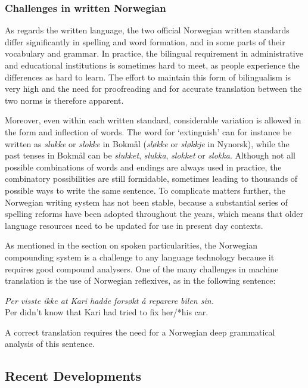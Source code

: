 \begin{multicols}{2}
\subsubsection{Challenges in written Norwegian}

As regards the written language, the two official Norwegian written standards differ significantly in spelling and word formation, and in some parts of their vocabulary and grammar. 
In practice, the bilingual requirement in administrative and educational institutions is sometimes hard to meet, as people experience the differences as hard to learn. 
The effort to maintain this form of bilingualism is very high and the need for proofreading and for accurate translation between the two norms is therefore apparent.


Moreover, even within each written standard, considerable variation is allowed in the form and inflection of words. 
The word for `extinguish' can for instance be written as \textit{slukke} or \textit{slokke} in Bokmål (\textit{sløkke} or \textit{sløkkje} in Nynorsk), while the past tenses in Bokmål can be \textit{slukket}, \textit{slukka}, \textit{slokket} or \textit{slokka}. 
Although not all possible combinations of words and endings are always used in practice, the combinatory possibilities are still formidable, sometimes leading to thousands of possible ways to write the same sentence. 
To complicate matters further, the Norwegian writing system has not been stable, because a substantial series of spelling reforms have been adopted throughout the years, which means that older language resources need to be updated for use in present day contexts.

As mentioned in the section on spoken particularities, the Norwegian compounding system is a challenge to any language technology because it requires good compound analysers.
One of the many challenges in machine translation is the use of Norwegian reflexives, as in the following sentence:

\medskip
\emph{Per visste ikke at Kari hadde forsøkt å reparere bilen \emph{sin}.}\\
Per didn’t know that Kari had tried to fix her/*his car.

\medskip
A correct translation requires the need for a Norwegian deep grammatical analysis of this sentence.

\subsection{Recent Developments}


\end{multicols}
